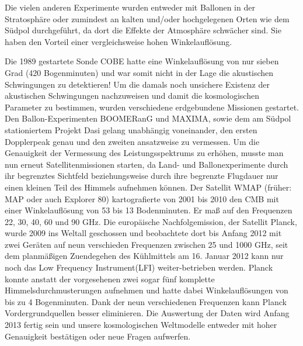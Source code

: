 \documentclass[10pt,a4paper]{article}
\begin{document}
Die vielen anderen Experimente wurden entweder mit Ballonen in der Stratosphäre oder zumindest an kalten und/oder hochgelegenen Orten wie dem Südpol durchgeführt, da dort die Effekte der Atmosphäre schwächer sind. Sie haben den Vorteil einer vergleichsweise hohen Winkelauflösung.

Die 1989 gestartete Sonde COBE hatte eine Winkelauflösung von nur sieben Grad (420 Bogenminuten) und war somit nicht in der Lage die akustischen Schwingungen zu detektieren!\cite{S+W00} Um die damals noch unsichere Existenz der akustischen Schwingungen nachzuweisen und damit die kosmologischen Parameter zu bestimmen, wurden verschiedene erdgebundene Missionen gestartet. Den Ballon-Experimenten BOOMERanG und MAXIMA, sowie dem am Südpol stationiertem Projekt Dasi gelang unabhängig voneinander, den ersten Dopplerpeak genau und den zweiten ansatzweise zu vermessen.\cite{S+W03} Um die Genauigkeit der Vermessung des Leistungsspektrums zu erhöhen, musste man nun erneut Satellitenmissionen starten, da Land- und Ballonexperimente durch ihr begrenztes Sichtfeld beziehungsweise durch ihre begrenzte Flugdauer nur einen kleinen Teil des Himmels aufnehmen können.
Der Satellit WMAP (früher: MAP oder auch Explorer 80) kartografierte von 2001 bis 2010 den CMB mit einer Winkelauflösung von 53 bis 13 Bodenminuten.\cite{PJ1} Er maß auf den Frequenzen 22, 30, 40, 60 und 90 GHz.
Die europäische Nachfolgemission, der Satellit Planck, wurde 2009 ins Weltall geschossen und beobachtete dort bis Anfang 2012 mit zwei Geräten auf neun verschieden Frequenzen zwischen 25 und 1000 GHz, seit dem planmäßigen Zuendegehen des Kühlmittels am 16. Januar 2012 kann nur noch das \glqq Low Frequency Instrument\grqq (LFI) weiter-betrieben werden\cite{PJ1}\cite{pm}.
Planck konnte anstatt der vorgesehenen zwei sogar fünf komplette Himmelsdurchmusterungen aufnehmen und hatte dabei Winkelauflösungen von bis zu 4 Bogenminuten. %
Dank der neun verschiedenen Frequenzen kann Planck Vordergrundquellen besser eliminieren. Die Auswertung der Daten wird Anfang 2013 fertig sein und unsere kosmologischen Weltmodelle entweder mit hoher Genauigkeit bestätigen oder neue Fragen aufwerfen.

\newpage
{}

\end{document}
